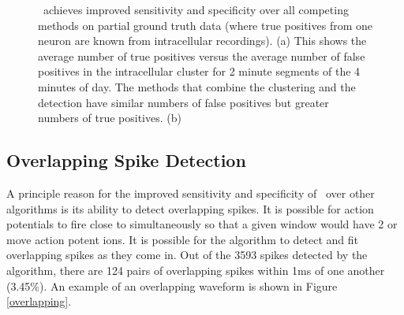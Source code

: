 \begin{center}
\begin{figure}
\caption{\smug~achieves improved sensitivity and specificity over all competing methods on partial ground truth data (where true positives from one neuron are known from intracellular recordings).  (a) This shows the average number of true positives versus the average number of false positives in the intracellular cluster for 2 minute segments of the 4 minutes of day.  The methods that combine the clustering and the detection have similar numbers of false positives but greater numbers of true positives.    (b)   
}
\end{figure}
\end{center}


\subsection{Overlapping Spike Detection}

A principle reason for the improved sensitivity and specificity of \smug~over other algorithms is its ability to detect overlapping spikes.   
It is possible for action potentials to fire close to simultaneously so that a given window would have 2 or move action potent ions.  It is possible for the algorithm to detect and fit overlapping spikes as they come in.  Out of the 3593 spikes detected by the algorithm, there are 124 pairs of overlapping spikes within 1ms of one another (3.45\%).  An example of an overlapping waveform is shown in Figure \ref{overlapping}.


